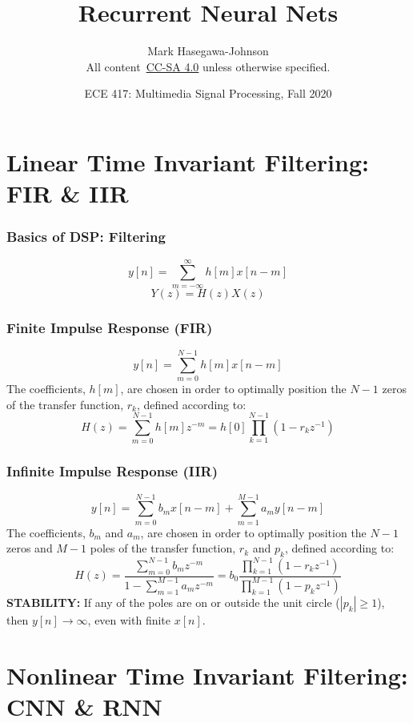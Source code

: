 \documentclass{beamer}
\title{Recurrent Neural Nets}
\author{Mark Hasegawa-Johnson\\All content~\href{https://creativecommons.org/licenses/by-sa/4.0/}{CC-SA 4.0} unless otherwise specified.}
\date{ECE 417: Multimedia Signal Processing, Fall 2020}
\begin{document}
\begin{frame}
  \maketitle
\end{frame}

\begin{frame}
  \tableofcontents
\end{frame}

\section[FIR/IIR]{Linear Time Invariant Filtering: FIR \& IIR}
\setcounter{subsection}{1}

\begin{frame}
  \frametitle{Basics of DSP: Filtering}
  \[
  y[n] = \sum_{m=-\infty}^\infty h[m] x[n-m]
  \]
  \[
  Y(z)=H(z)X(z)
  \]
\end{frame}

\begin{frame}
  \frametitle{Finite Impulse Response (FIR)}
  \[
  y[n] = \sum_{m=0}^{N-1}h[m]x[n-m]
  \]
  The coefficients, $h[m]$, are chosen in order to optimally position
  the $N-1$ zeros of the transfer function, $r_k$, defined according to:
  \[
  H(z)=\sum_{m=0}^{N-1}h[m] z^{-m}=h[0]\prod_{k=1}^{N-1}\left(1-r_kz^{-1}\right)
  \]
\end{frame}

\begin{frame}
  \frametitle{Infinite Impulse Response (IIR)}
  \[
  y[n] = \sum_{m=0}^{N-1}b_mx[n-m] + \sum_{m=1}^{M-1}a_m y[n-m]
  \]
  The coefficients, $b_m$ and $a_m$, are chosen in order to optimally
  position the $N-1$ zeros and $M-1$ poles of the transfer function,
  $r_k$ and $p_k$, defined according to:
  \[
  H(z)=\frac{\sum_{m=0}^{N-1}b_m z^{-m}}{1-\sum_{m=1}^{M-1}a_m z^{-m}}
  =b_0\frac{\prod_{k=1}^{N-1}\left(1-r_kz^{-1}\right)}{\prod_{k=1}^{M-1}\left(1-p_kz^{-1}\right)}
  \]
  {\bf STABILITY:} If any of the poles are on or outside the unit
  circle ($|p_k|\ge 1$), then $y[n]\rightarrow\infty$, even with
  finite $x[n]$.
\end{frame}

\section[CNN/RNN]{Nonlinear Time Invariant Filtering: CNN \& RNN}
\setcounter{subsection}{1}
\end{document}
